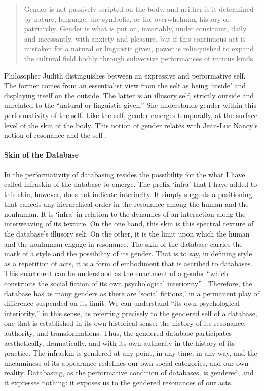 \begin{quote}
	Gender is not passively scripted on the body, and neither is it determined by nature, language, the symbolic, or the overwhelming history of patriarchy. Gender is what is put on, invariably, under constraint, daily and incessantly, with anxiety and pleasure, but if this continuous act is mistaken for a natural or linguistic given, power is relinquished to expand the cultural field bodily through subversive performances of various kinds. \parencite[531]{But88:Per}
\end{quote}

Philosopher Judith \textcite{But88:Per} distinguishes between an expressive and performative self. The former comes from an essentialist view from the self as being `inside' and displaying itself on the outside. The latter is an illusory self, strictly outside and unrelated to the ``natural or linguistic given.'' She understands gender within this performativity of the self. Like the self, gender emerges temporally, at the surface level of the skin of the body. This notion of gender relates with Jean-Luc Nancy's notion of resonance and the self .

\paragraph{Skin of the Database}
In the performativity of databasing resides the possibility for the what I have called infraskin of the database to emerge. The prefix `infra' that I have added to this skin, however, does not indicate interiority. It simply suggests a positioning that cancels any hierarchical order in the resonance among the human and the nonhuman. It is `infra' in relation to the dynamics of an interaction along the interweaving of its texture. On the one hand, this skin is this spectral texture of the database's illusory self. On the other, it is the limit upon which the human and the nonhuman engage in resonance. The skin of the database carries the mark of a style and the possibility of its gender. That is to say, in defining style as a repetition of acts, it is a form of embodiment that is ascribed to databases. This enactment can be understood as the enactment of a gender ``which constructs the social fiction of its own psychological interiority'' \parencite[528]{But88:Per}. Therefore, the database has as many genders as there are `social fictions,' in a permanent play of difference suspended on its limit. We can understand ``its own psychological interiority,'' in this sense, as referring precisely to the gendered self of a database, one that is established in its own historical sense: the history of its resonance, authority, and transformations. Thus, the gendered database participates aesthetically, dramatically, and with its own authority in the history of its practice. The infraskin is gendered at any point, in any time, in any way, and the uncanniness of its appearance redefines our own social categories, and our own reality. Databasing, as the performative condition of databases, is gendered, and it expresses nothing: it exposes us to the gendered resonances of our acts.

